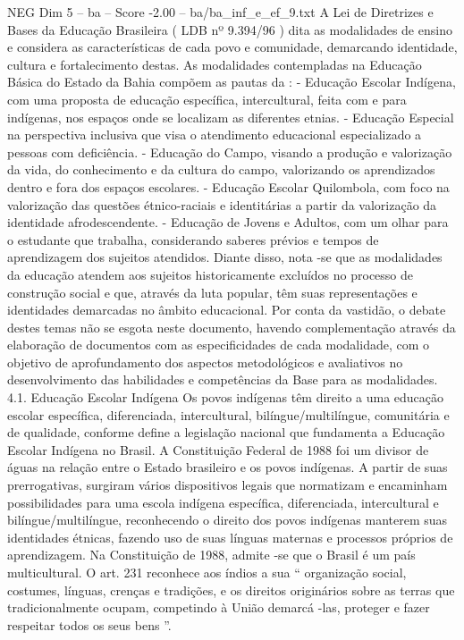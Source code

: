 \begin{textsample}{NEG Dim 5 – ba – Score -2.00 – ba/ba\_inf\_e\_ef\_9.txt}  \label{ex:f5_neg_018}
A Lei de Diretrizes e Bases da Educação Brasileira ( LDB nº 9.394/96 ) dita as modalidades de ensino e considera as características de cada povo e comunidade, demarcando identidade, cultura e fortalecimento destas.
As modalidades contempladas na Educação Básica do Estado da Bahia compõem as pautas da : - Educação Escolar Indígena, com uma proposta de educação específica, intercultural, feita com e para indígenas, nos espaços onde se localizam as diferentes etnias. - Educação Especial na perspectiva inclusiva que visa o atendimento educacional especializado a pessoas com deficiência. - Educação do Campo, visando a produção e valorização da vida, do conhecimento e da cultura do campo, valorizando os aprendizados dentro e fora dos espaços escolares. - Educação Escolar Quilombola, com foco na valorização das questões étnico-raciais e identitárias a partir da valorização da identidade afrodescendente. - Educação de Jovens e Adultos, com um olhar para o estudante que trabalha, considerando saberes prévios e tempos de aprendizagem dos sujeitos atendidos.
Diante disso, nota -se que as modalidades da educação atendem aos sujeitos historicamente excluídos no processo de construção social e que, através da luta popular, têm suas representações e identidades demarcadas no âmbito educacional.
Por conta da vastidão, o debate destes temas não se esgota neste documento, havendo complementação através da elaboração de documentos com as especificidades de cada modalidade, com o objetivo de aprofundamento dos aspectos metodológicos e avaliativos no desenvolvimento das habilidades e competências da Base para as modalidades. 4.1.
Educação Escolar Indígena Os povos indígenas têm direito a uma educação escolar específica, diferenciada, intercultural, bilíngue/multilíngue, comunitária e de qualidade, conforme define a legislação nacional que fundamenta a Educação Escolar Indígena no Brasil.
A Constituição Federal de 1988 foi um divisor de águas na relação entre o Estado brasileiro e os povos indígenas.
A partir de suas prerrogativas, surgiram vários dispositivos legais que normatizam e encaminham possibilidades para uma escola indígena específica, diferenciada, intercultural e bilíngue/multilíngue, reconhecendo o direito dos povos indígenas manterem suas identidades étnicas, fazendo uso de suas línguas maternas e processos próprios de aprendizagem.
Na Constituição de 1988, admite -se que o Brasil é um país multicultural.
O art. 231 reconhece aos índios a sua “ organização social, costumes, línguas, crenças e tradições, e os direitos originários sobre as terras que tradicionalmente ocupam, competindo à União demarcá -las, proteger e fazer respeitar todos os seus bens ”.

\end{textsample}
